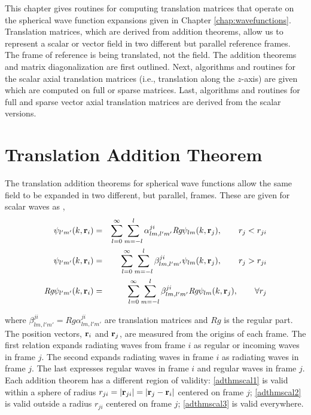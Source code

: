 
\vspace{-5mm}
This chapter gives routines for computing translation matrices that operate on the spherical wave function expansions given in Chapter \ref{chap:wavefunctions}. Translation matrices, which are derived from addition theorems, allow us to represent a scalar or vector field in two different but parallel reference frames. The frame of reference is being translated, not the field. The addition theorems and matrix diagonalization are first outlined. Next, algorithms and routines for the scalar axial translation matrices (i.e., translation along the $z$-axis) are given which are computed on full or sparse matrices. Last, algorithms and routines for full and sparse vector axial translation matrices are derived from the scalar versions.  

\vspace{-2mm}
\section{Translation Addition Theorem}

The translation addition theorems for spherical wave functions allow the same field to be expanded in two different, but parallel, frames. These are given for scalar waves as \cite{chew1995waves}, 
\begin{eqnarray}
\psi_{l'm'}(k,\mathbf{r}_i) &=& \sum_{l=0}^{\infty}\sum_{m=-l}^{l} \alpha^{ji}_{lm,l'm'} \textit{Rg}\psi_{lm}(k,\mathbf{r}_j), \quad \quad r_j < r_{ji} \label{adthmscal1} \\
\psi_{l'm'}(k,\mathbf{r}_i) &=& \sum_{l=0}^{\infty}\sum_{m=-l}^{l} \beta^{ji}_{lm,l'm'}\psi_{lm}(k,\mathbf{r}_j), \quad \quad r_j > r_{ji} \label{adthmscal2}\\
\textit{Rg}\psi_{l'm'}(k,\mathbf{r}_i) &=& \sum_{l=0}^{\infty}\sum_{m=-l}^{l} \beta^{ji}_{lm,l'm'}\textit{Rg}\psi_{lm}(k,\mathbf{r}_j), \quad \quad \forall r_j \label{adthmscal3}  
\end{eqnarray}

\noindent where $\beta^{ji}_{lm,l'm'} = \textit{Rg} \alpha^{ji}_{lm,l'm'}$ are translation matrices and $\textit{Rg}$ is the regular part. The position vectors, $\mathbf{r}_i$ and $\mathbf{r}_j$, are measured from the origins of each frame. The first relation expands radiating waves from frame $i$ as regular or incoming waves in frame $j$. The second expands radiating waves in frame $i$ as radiating waves in frame $j$. The last expresses regular waves in frame $i$ and regular waves in frame $j$. Each addition theorem has a different region of validity: \eqref{adthmscal1} is valid within a sphere of radius $r_{ji} = \vert \mathbf{r}_{ji} \vert = \vert \mathbf{r}_j- \mathbf{r}_i\vert$ centered on frame $j$; \eqref{adthmscal2} is valid outside a radius $r_{ji}$ centered on frame $j$; \eqref{adthmscal3}  is valid everywhere. 


